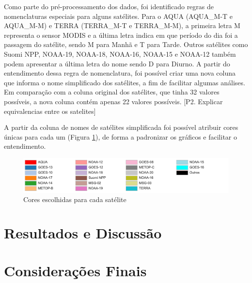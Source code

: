 \documentclass[cic,tc]{iiufrgs}
\begin{document}
Como parte do pré-processamento dos dados, foi identificado regras de nomenclaturas 
especiais para alguns satélites. Para o AQUA (AQUA\_M-T e AQUA\_M-M) e TERRA 
(TERRA\_M-T e TERRA\_M-M), a primeira letra M representa o sensor MODIS e a última
letra indica em que período do dia foi a passagem do satélite, sendo M para Manhã 
e T para Tarde. Outros satélites como Suomi NPP, NOAA-19, NOAA-18, NOAA-16, NOAA-15 
e NOAA-12 também podem apresentar a última letra do nome sendo D para Diurno.
A partir do entendimento dessa regra de nomenclatura, foi possível criar uma nova 
coluna que informa o nome simplificado dos satélites, a fim de facilitar 
algumas análises. Em comparação com a coluna original dos satélites, que tinha 32 
valores possíveis, a nova coluna contém apenas 22 valores possíveis.
[P2. Explicar equivalencias entre os satelites] \par

A partir da coluna de nomes de satélites simplificada foi possível atribuir cores 
únicas para cada um (Figura \ref{fig:cores_satelites}), de forma a padronizar os 
gráficos e facilitar o entendimento.

\begin{figure}[H]
    \caption{Cores escolhidas para cada satélite}
    \begin{center}
        \includegraphics[width=35em]{cores_satelites}
    \end{center}
    \label{fig:cores_satelites}
\end{figure}




\chapter{Resultados e Discussão}




\chapter{Considerações Finais}





\end{document}

